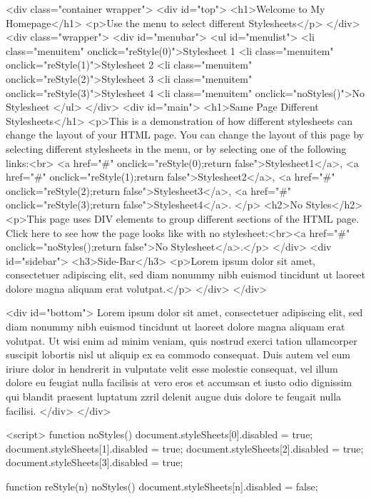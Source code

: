 <div class="container wrapper">
  <div id="top">
    <h1>Welcome to My Homepage</h1>
    <p>Use the menu to select different Stylesheets</p>
  </div>
  <div class="wrapper">
   <div id="menubar">
     <ul id="menulist">
       <li class="menuitem" onclick="reStyle(0)">Stylesheet 1
       <li class="menuitem" onclick="reStyle(1)">Stylesheet 2
       <li class="menuitem" onclick="reStyle(2)">Stylesheet 3
       <li class="menuitem" onclick="reStyle(3)">Stylesheet 4
       <li class="menuitem" onclick="noStyles()">No Stylesheet
     </ul>
    </div>
    <div id="main">
      <h1>Same Page Different Stylesheets</h1>
      <p>This is a demonstration of how different stylesheets can change the layout of your HTML page. You can change the layout of this page by selecting different stylesheets in the menu, or by selecting one of the following links:<br>
      <a href="#" onclick="reStyle(0);return false">Stylesheet1</a>,
      <a href="#" onclick="reStyle(1);return false">Stylesheet2</a>,
      <a href="#" onclick="reStyle(2);return false">Stylesheet3</a>,
      <a href="#" onclick="reStyle(3);return false">Stylesheet4</a>.
      </p>
       <h2>No Styles</h2>
      <p>This page uses DIV elements to group different sections of the HTML page. Click here to see how the page looks like with no stylesheet:<br><a href="#" onclick="noStyles();return false">No Stylesheet</a>.</p>
   </div>
    <div id="sidebar">
      <h3>Side-Bar</h3>
      <p>Lorem ipsum dolor sit amet, consectetuer adipiscing elit, sed diam nonummy nibh euismod tincidunt ut laoreet dolore magna aliquam erat volutpat.</p>
    </div>
  </div>  
  
  
  <div id="bottom">
    Lorem ipsum dolor sit amet, consectetuer adipiscing elit, sed diam nonummy nibh euismod tincidunt ut laoreet dolore magna aliquam erat volutpat. Ut wisi enim ad minim veniam, quis nostrud exerci tation ullamcorper suscipit lobortis nisl ut aliquip ex ea commodo consequat. Duis autem vel eum iriure dolor in hendrerit in vulputate velit esse molestie consequat, vel illum dolore eu feugiat nulla facilisis at vero eros et accumsan et iusto odio dignissim qui blandit praesent luptatum zzril delenit augue duis dolore te feugait nulla facilisi.
  </div>
</div>

<script>
function noStyles() {
    document.styleSheets[0].disabled = true;
    document.styleSheets[1].disabled = true;
    document.styleSheets[2].disabled = true;
    document.styleSheets[3].disabled = true;
}

function reStyle(n) {
    noStyles()
    document.styleSheets[n].disabled = false;
}

